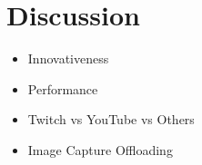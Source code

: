 \section{Discussion}
\begin{itemize}
    \item Innovativeness
    \item Performance
    \item Twitch vs YouTube vs Others
    \item Image Capture Offloading
\end{itemize}